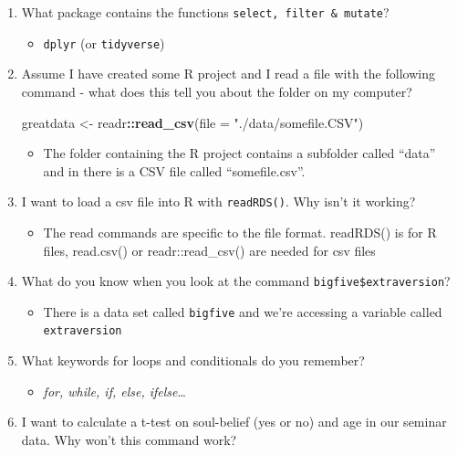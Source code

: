 \documentclass[
]{book}
\newenvironment{Shaded}{\begin{snugshade}}{\end{snugshade}}
\newcommand{\AttributeTok}[1]{\textcolor[rgb]{0.13,0.29,0.53}{#1}}
\newcommand{\FunctionTok}[1]{\textcolor[rgb]{0.13,0.29,0.53}{\textbf{#1}}}
\newcommand{\NormalTok}[1]{#1}
\newcommand{\OtherTok}[1]{\textcolor[rgb]{0.56,0.35,0.01}{#1}}
\newcommand{\SpecialCharTok}[1]{\textcolor[rgb]{0.81,0.36,0.00}{\textbf{#1}}}
\newcommand{\StringTok}[1]{\textcolor[rgb]{0.31,0.60,0.02}{#1}}
\providecommand{\tightlist}{%
  \setlength{\itemsep}{0pt}\setlength{\parskip}{0pt}}
\begin{document}
\begin{enumerate}
\def\labelenumi{\arabic{enumi}.}
\item
  What package contains the functions \texttt{select,\ filter\ \&\ mutate}?

  \begin{itemize}
  \tightlist
  \item
    \texttt{dplyr} (or \texttt{tidyverse})
  \end{itemize}
\item
  Assume I have created some R project and I read a file with the following command - what does this tell you about the folder on my computer?

\begin{Shaded}
\begin{Highlighting}[]
\NormalTok{greatdata }\OtherTok{\textless{}{-}}\NormalTok{ readr}\SpecialCharTok{::}\FunctionTok{read\_csv}\NormalTok{(}\AttributeTok{file =} \StringTok{"./data/somefile.CSV"}\NormalTok{)}
\end{Highlighting}
\end{Shaded}

  \begin{itemize}
  \tightlist
  \item
    The folder containing the R project contains a subfolder called ``data'' and in there is a CSV file called ``somefile.csv''.
  \end{itemize}
\item
  I want to load a csv file into R with \texttt{readRDS()}. Why isn't it working?

  \begin{itemize}
  \tightlist
  \item
    The read commands are specific to the file format. readRDS() is for R files, read.csv() or readr::read\_csv() are needed for csv files
  \end{itemize}
\item
  What do you know when you look at the command \texttt{bigfive\$extraversion}?

  \begin{itemize}
  \tightlist
  \item
    There is a data set called \texttt{bigfive} and we're accessing a variable called \texttt{extraversion}
  \end{itemize}
\item
  What keywords for loops and conditionals do you remember?

  \begin{itemize}
  \tightlist
  \item
    \emph{for, while, if, else, ifelse}\ldots{}
  \end{itemize}
\item
  I want to calculate a t-test on soul-belief (yes or no) and age in our seminar data. Why won't this command work?


\end{enumerate}
\end{document}
